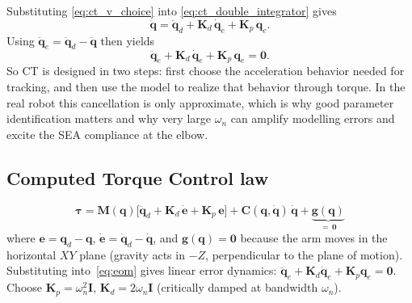 \documentclass[11pt,a4paper]{article}
\newcommand{\vq}{\bm{q}}
\newcommand{\vqd}{\dot{\bm{q}}}
\newcommand{\vqdd}{\ddot{\bm{q}}}
\newcommand{\vtau}{\bm{\tau}}
\newcommand{\ve}{\bm{e}}
\newcommand{\ved}{\dot{\bm{e}}}
\newcommand{\M}{\bm{M}}
\newcommand{\Cor}{\bm{C}}
\newcommand{\vg}{\bm{g}}
\newcommand{\Kp}{\bm{K}_p}
\newcommand{\Kd}{\bm{K}_d}
\begin{document}
Substituting \eqref{eq:ct_v_choice} into \eqref{eq:ct_double_integrator} gives
\begin{equation}
  \vqdd = \vqdd_d + \Kd\,\vqd_e + \Kp\,\vq_e.
\end{equation}
Using $\vqdd_e = \vqdd_d - \vqdd$ then yields
\begin{equation}
  \vqdd_e + \Kd\,\vqd_e + \Kp\,\vq_e = \mathbf{0}.
  \label{eq:ct_error_dyn}
\end{equation}
So CT is designed in two steps: first choose the acceleration behavior needed
for tracking, and then use the model to realize that behavior through torque.
In the real robot this cancellation is only approximate, which is why good
parameter identification matters and why very large $\omega_n$ can amplify
modelling errors and excite the SEA compliance at the elbow.

\subsection{Computed Torque Control law}

\begin{equation}
  \boxed{
    \vtau = \M(\vq)\bigl[\vqdd_d + \Kd\,\ved + \Kp\,\ve\bigr]
          + \Cor(\vq,\vqd)\,\vqd + \underbrace{\vg(\vq)}_{=\,\mathbf{0}}
  }
  \label{eq:ctc}
\end{equation}
where $\ve{=}\vq_d{-}\vq$, $\ved{=}\vqd_d{-}\vqd$, and
$\vg(\vq)=\mathbf{0}$ because the arm moves in the horizontal $XY$ plane
(gravity acts in $-Z$, perpendicular to the plane of motion).
Substituting into~\eqref{eq:eom} gives linear error dynamics:
$\vqdd_e + \Kd\vqd_e + \Kp\vq_e = \mathbf{0}$.
Choose $\Kp{=}\omega_n^2\mathbf{I}$, $\Kd{=}2\omega_n\mathbf{I}$
(critically damped at bandwidth $\omega_n$).
\end{document}
